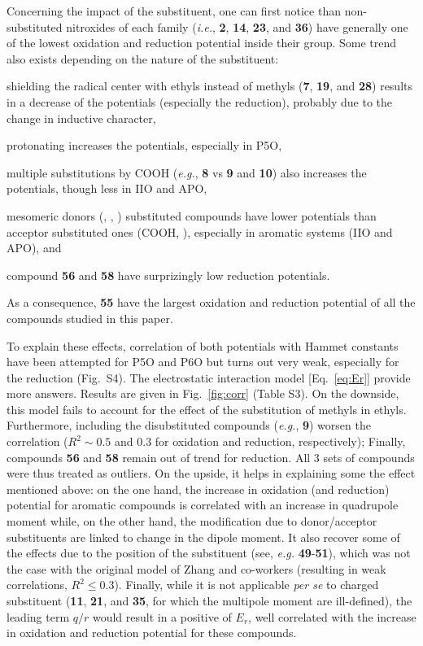 \documentclass[review]{elsarticle}
\begin{document}
Concerning the impact of the substituent, one can first notice than non-substituted nitroxides of each family (\textit{i.e.}, \textbf{2}, \textbf{14}, \textbf{23}, and \textbf{36}) have generally one of the lowest oxidation and reduction potential inside their group. Some trend also exists depending on the nature of the substituent: \begin{inparaenum}[(i)]
	\item shielding the radical center with ethyls instead of methyls (\textbf{7}, \textbf{19}, and \textbf{28}) results in a decrease of the potentials (especially the reduction), probably due to the change in inductive character, 
	\item  protonating  increases the potentials, especially in P5O,
	\item multiple substitutions by COOH (\textit{e.g.},  \textbf{8} vs \textbf{9} and \textbf{10}) also increases the potentials, though less in IIO and APO, 
	\item mesomeric donors (, , ) substituted compounds have lower potentials than acceptor substituted ones (COOH, ), especially in aromatic systems (IIO and APO), and
	\item  compound \textbf{56} and \textbf{58} have surprizingly low reduction potentials.
\end{inparaenum}
As a consequence, \textbf{55} have the largest oxidation and reduction potential of all the compounds studied in this paper.

To explain these effects, correlation of both potentials with Hammet constants have been attempted for P5O and P6O but turns out very weak, especially for the reduction (Fig.~S4).  The electrostatic interaction model [Eq.~\eqref{eq:Er}] provide more answers. Results are given in Fig.~\ref{fig:corr} (Table S3). On the downside, this model fails to account for the effect of the substitution of methyls in ethyls.  Furthermore, including the disubstituted compounds (\textit{e.g.}, \textbf{9}) worsen the correlation ($R^2 \sim 0.5$ and 0.3 for oxidation and reduction, respectively); Finally, compounds \textbf{56} and \textbf{58} remain out of trend for reduction. All  3 sets of compounds were thus treated as outliers. On the upside, it helps in explaining some the effect mentioned above: on the one hand, the increase in oxidation (and reduction) potential for aromatic compounds is correlated with an increase in quadrupole moment while, on the other hand, the modification due to donor/acceptor substituents are linked to change in the dipole moment. It also recover some of the effects due to the position of the substituent (see, \textit{e.g.} \textbf{49}-\textbf{51}), which was not  the case with the original model of Zhang and co-workers (resulting in weak correlations, $R^2\leq 0.3$).  Finally, while it is not applicable \textit{per se} to charged substituent (\textbf{11}, \textbf{21}, and \textbf{35}, for which the multipole moment are ill-defined), the leading term $q/r$ would result in a positive of $E_r$, well correlated with the increase in oxidation and reduction potential for these compounds. 
\end{document}
